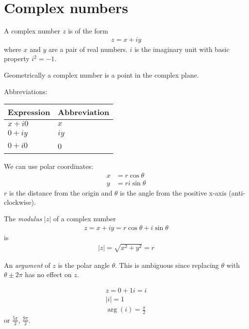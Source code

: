 \section{Complex numbers}

\begin{df}
	A complex number $z$ is of the form
	\begin{align*}
	z = x + iy
	\end{align*}
	where $x$ and $y$ are a pair of real numbers. $i$ is the imaginary unit with basic property $i^2 = -1$.
\end{df}

Geometrically a complex number is a point in the complex plane.

Abbreviations:
\begin{center}
\begin{tabularx}{.5\textwidth}{XX}
	\toprule
	Expression & Abbreviation \\
	\toprule
	$x+i0$ & $x$ \\
	$0+iy$ & $iy$ \\
	$0 + i0$ & 0 \\
	\bottomrule
\end{tabularx}
\end{center}

We can use polar coordinates:
\begin{align*}
x & = r \cos \theta \\
y & = r i \sin \theta
\end{align*}
$r$ is the distance from the origin and $\theta$ is the angle from the positive x-axis (anti-clockwise).


\begin{df}
	The \emph{modulus} $|z|$ of a complex number
	\begin{align*}
	z = x + iy = r \cos \theta + i \sin \theta
	\end{align*}
	is
	\begin{align*}
	|z| = \sqrt{x^2+ y^2} = r
	\end{align*}
\end{df}

\begin{df}
An \emph{argument} of $z$ is the polar angle $\theta$. This is ambiguous since replacing $\theta$ with $\theta \pm 2 \pi$ has no effect on $z$.
\end{df}

\begin{ex}
	\begin{align*}
	z = 0 + 1i = i \\
	|i| = 1 \\
	\operatorname{arg}(i) = \frac \pi 2
	\end{align*}
	or $\frac{5 \pi} 2$, $\frac{9 \pi}{2}$.
\end{ex}

